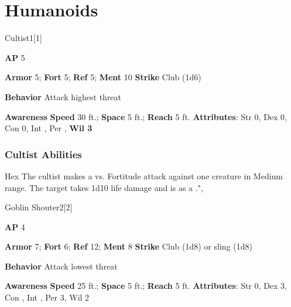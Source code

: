 \section{Humanoids}
\begin{monsection}{Cultist}{1}[1]
\vspace{-1em}\vspace{-1em}
\begin{spellcontent}
\begin{spelltargetinginfo}
{\textbf{AP} 5}

\pari \textbf{Armor} 5;
\textbf{Fort} 5;
\textbf{Ref} 5;
\textbf{Ment} 10
\pari \textbf{Strike} Club  (1d6)



\pari \textbf{Behavior} Attack highest threat
\end{spelltargetinginfo}
\end{spellcontent}

\begin{monsterfooter}
\pari \textbf{Awareness} 
\pari \textbf{Speed} 30 ft.;
\textbf{Space} 5 ft.;
\textbf{Reach} 5 ft.
\pari \textbf{Attributes}:
Str 0,
Dex 0,
Con 0,
Int ,
Per ,
\textbf{Wil 3}
\end{monsterfooter}
\end{monsection}


\subsubsection{Cultist Abilities}

\begin{ability}{Hex}
The cultist makes a  vs. Fortitude attack against one creature in Medium range.
\hit The target takes 1d10 life damage and is  as a .",
\end{ability}

\begin{monsection}{Goblin Shouter}{2}[2]
\vspace{-1em}\vspace{-1em}
\begin{spellcontent}
\begin{spelltargetinginfo}
{\textbf{AP} 4}

\pari \textbf{Armor} 7;
\textbf{Fort} 6;
\textbf{Ref} 12;
\textbf{Ment} 8
\pari \textbf{Strike} Club  (1d8) or sling  (1d8)



\pari \textbf{Behavior} Attack lowest threat
\end{spelltargetinginfo}
\end{spellcontent}

\begin{monsterfooter}
\pari \textbf{Awareness} 
\pari \textbf{Speed} 25 ft.;
\textbf{Space} 5 ft.;
\textbf{Reach} 5 ft.
\pari \textbf{Attributes}:
Str 0,
Dex 3,
Con ,
Int ,
Per 3,
Wil 2
\end{monsterfooter}
\end{monsection}


